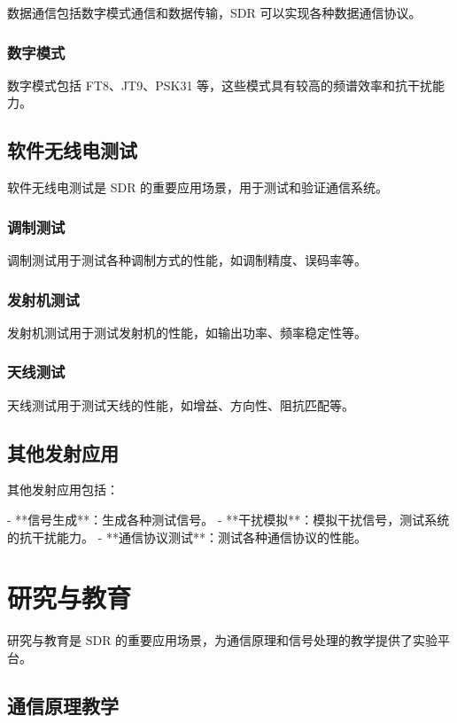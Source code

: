 \documentclass[UTF8]{ctexbook}
\begin{document}
数据通信包括数字模式通信和数据传输，SDR 可以实现各种数据通信协议。

\subsubsection{数字模式}

数字模式包括 FT8、JT9、PSK31 等，这些模式具有较高的频谱效率和抗干扰能力。

\subsection{软件无线电测试}

软件无线电测试是 SDR 的重要应用场景，用于测试和验证通信系统。

\subsubsection{调制测试}

调制测试用于测试各种调制方式的性能，如调制精度、误码率等。

\subsubsection{发射机测试}

发射机测试用于测试发射机的性能，如输出功率、频率稳定性等。

\subsubsection{天线测试}

天线测试用于测试天线的性能，如增益、方向性、阻抗匹配等。

\subsection{其他发射应用}

其他发射应用包括：

- **信号生成**：生成各种测试信号。
- **干扰模拟**：模拟干扰信号，测试系统的抗干扰能力。
- **通信协议测试**：测试各种通信协议的性能。

\section{研究与教育}

研究与教育是 SDR 的重要应用场景，为通信原理和信号处理的教学提供了实验平台。

\subsection{通信原理教学}
\end{document}
